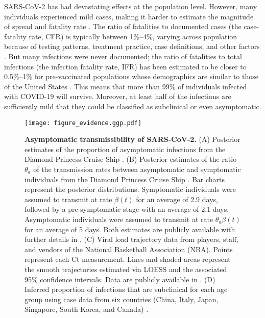 \documentclass[12pt]{article}
\begin{document}
\pagebreak

SARS-CoV-2 has had devastating effects at the population level.
However, many individuals experienced mild cases, making it harder to estimate the magnitude of spread and fatality rate \citep{nogrady2020data}.
The ratio of fatalities to documented cases (the case-fatality rate, CFR) is typically between 1\%--4\%, varying across population because of testing patterns, treatment practice, case definitions, and other factors \citep{rajgor2020many,VERITY2020669,yang2020early}.
But many infections were never documented;
the ratio of fatalities to total infections (the infection fatality rate, IFR) has been estimated to be closer to 0.5\%--1\% for pre-vaccinated populations whose demographics are similar to those of the United States \citep{levin2020assessing}. 
This means that more than 99\% of individuals infected with COVID-19 will survive. 
Moreover, at least half of the infections are sufficiently mild that they could be classified as subclinical or even asymptomatic. 

\begin{figure}[!ht]
\texttt{[image: figure\_evidence.ggp.pdf]}
\caption{
\textbf{Asymptomatic transmissibility of SARS-CoV-2.}
(A) Posterior estimates of the proportion of asymptomatic infections from the Diamond Princess Cruise Ship \cite{emery2020}.
(B) Posterior estimates of the ratio $\theta_a$ of the transmission rates between asymptomatic and symptomatic individuals from the Diamond Princess Cruise Ship \cite{emery2020}.
Bar charts represent the posterior distributions.
Symptomatic individuals were assumed to transmit at rate $\beta(t)$ for an average of 2.9 days, followed by a pre-symptomatic stage with an average of 2.1 days. 
Asymptomatic individuals were assumed to transmit at rate $\theta_a \beta(t)$ for an average of 5 days.
Both estimates are publicly available with further details in \cite{emery2020}.
(C) Viral load trajectory data from players, staff, and vendors of the National Basketball Association (NBA).
Points represent each Ct measurement.
Lines and shaded areas represent the smooth trajectories estimated via LOESS and the associated 95\% confidence intervals.
Data are publicly available in \cite{Kissler2020}.
(D) Inferred proportion of infections that are subclinical for each age group using case data from six countries (China, Italy, Japan, Singapore, South Korea, and Canada) \cite{davies2020}.
}
\label{fig:evidence}
\end{figure}
\end{document}
